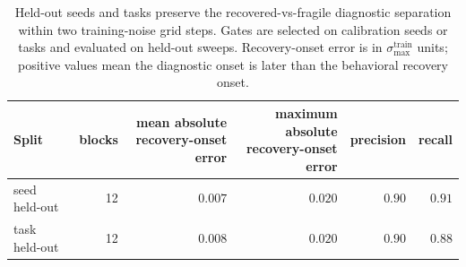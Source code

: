 \begin{table}[htbp]
\centering
\caption{Held-out seeds and tasks preserve the recovered-vs-fragile diagnostic separation within two training-noise grid steps. Gates are selected on calibration seeds or tasks and evaluated on held-out sweeps. Recovery-onset error is in $\sigma_{\max}^{\mathrm{train}}$ units; positive values mean the diagnostic onset is later than the behavioral recovery onset.}
\label{tab:heldout-diagnostic-validation}
\small
\setlength{\tabcolsep}{4pt}
\begin{tabular}{lrrrrr}
\toprule
Split & blocks & \shortstack{mean absolute\\recovery-onset error} & \shortstack{maximum absolute\\recovery-onset error} & precision & recall \\
\midrule
seed held-out & 12 & $0.007$ & $0.020$ & $0.90$ & $0.91$ \\
task held-out & 12 & $0.008$ & $0.020$ & $0.90$ & $0.88$ \\
\bottomrule
\end{tabular}
\end{table}
